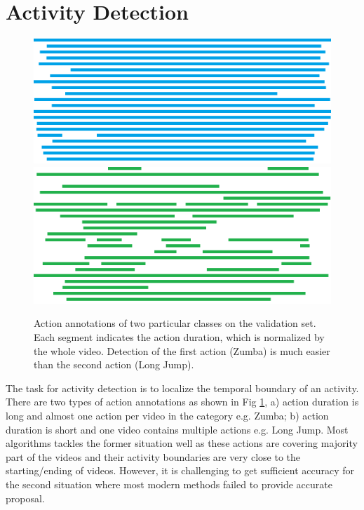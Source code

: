 \section{Activity Detection}
\label{sec:activity_detection}

\begin{figure}
    \centering
    \includegraphics[width=1\textwidth]{resources/Human_Poses/Zumba}
    \\
    \includegraphics[width=1\textwidth]{resources/Human_Poses/Long_jump}
    \caption{Action annotations of two particular classes on the validation set. Each segment indicates the action duration, which is normalized by the whole video. Detection of the first action (Zumba) is much easier than the second action (Long Jump).}
 
\label{fig:seg} %
\end{figure}

The task for activity detection is to localize the temporal boundary of an activity. There are two types of action annotations as shown in Fig \ref{fig:seg}, a) action duration is long and almost one action per video in the category e.g. Zumba; b) action duration is short and one video contains multiple actions e.g. Long Jump. Most algorithms tackles the former situation well as these actions are covering majority part of the videos and their activity boundaries are very close to the starting/ending of videos. However, it is challenging to get sufficient accuracy for the second situation where most modern methods failed to provide accurate proposal.

